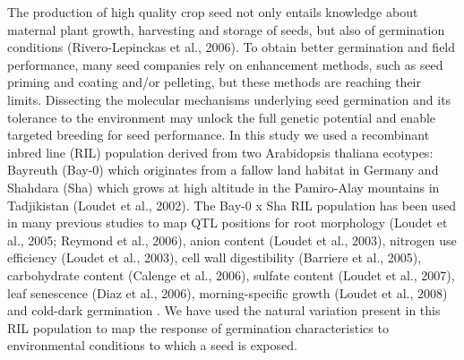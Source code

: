 \documentclass[8pt, twoside, a5paper]{report}
\begin{document}
The production of high quality crop seed not only entails knowledge about maternal plant growth, harvesting and storage of seeds, 
but also of germination conditions (Rivero-Lepinckas et al., 2006). To obtain better germination and field performance, many seed 
companies rely on enhancement methods, such as seed priming and coating and/or pelleting, but these methods are reaching their 
limits. Dissecting the molecular mechanisms underlying seed germination and its tolerance to the environment may unlock the full 
genetic potential and enable targeted breeding for seed performance. In this study we used a recombinant inbred line (RIL) population 
derived from two Arabidopsis thaliana ecotypes: Bayreuth (Bay-0) which originates from a fallow land habitat in Germany and Shahdara 
(Sha) which grows at high altitude in the Pamiro-Alay mountains in Tadjikistan (Loudet et al., 2002). The Bay-0 x Sha RIL population 
has been used in many previous studies to map QTL positions for root morphology (Loudet et al., 2005; Reymond et al., 2006), anion 
content (Loudet et al., 2003), nitrogen use efficiency (Loudet et al., 2003), cell wall digestibility (Barriere et al., 2005), 
carbohydrate content (Calenge et al., 2006), sulfate content (Loudet et al., 2007), leaf senescence (Diaz et al., 2006), 
morning-specific growth (Loudet et al., 2008) and cold-dark germination \cite{Meng:2008}. We have used the natural variation 
present in this RIL population to map the response of germination characteristics to environmental conditions to which a seed is exposed.
\end{document}
